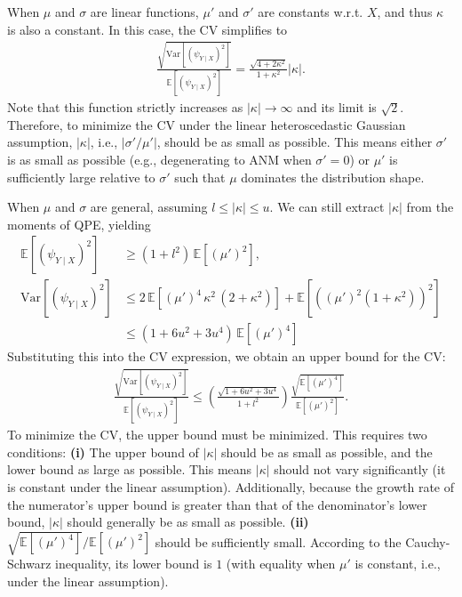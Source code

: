 \documentclass{article}
\theoremstyle{plain}
\theoremstyle{definition}
\theoremstyle{remark}
\begin{document}
When $\mu$ and $\sigma$ are linear functions, $\mu'$ and $\sigma'$ are constants w.r.t. $X$, and thus $\kappa$ is also a constant. In this case, the CV simplifies to 
\begin{align}
\label{eq:heteroscedastic-1}
\frac{\sqrt{\text{Var}\left[(\psi_{Y\mid X})^2\right]}}{\mathbb{E}\left[(\psi_{Y\mid X})^2\right]}=\frac{\sqrt{4+2\kappa^2}}{1+\kappa^2}|\kappa|.    
\end{align}
Note that this function strictly increases as $|\kappa|\to\infty$ and its limit is $\sqrt{2}$. Therefore, to minimize the CV under the linear heteroscedastic Gaussian assumption, $|\kappa|$, i.e., $|\sigma'/\mu'|$, should be as small as possible. This means either $\sigma'$ is as small as possible (e.g., degenerating to ANM when $\sigma'=0$) or $\mu'$ is sufficiently large relative to $\sigma'$ such that $\mu$ dominates the distribution shape.

When $\mu$ and $\sigma$ are general, assuming $l\le|\kappa|\le u$. We can still extract $|\kappa|$ from the moments of QPE, yielding
\[\begin{aligned}\mathbb{E}\left[(\psi_{Y\mid X})^2\right]&\ge(1+l^2)\,\mathbb{E}\left[(\mu')^2\right],\\\text{Var}\left[(\psi_{Y\mid X})^2\right]&\le2\,\mathbb{E}\left[(\mu')^4\,\kappa^2\,(2+\kappa^2)\right]+\mathbb{E}\left[((\mu')^2(1+\kappa^2))^2\right]\\&\le(1+6u^2+3u^4)\,\mathbb{E}\left[(\mu')^4\right]\end{aligned}\]
Substituting this into the CV expression, we obtain an upper bound for the CV:
\begin{align}
\label{eq:heteroscedastic-2}
\frac{\sqrt{\text{Var}\left[(\psi_{Y\mid X})^2\right]}}{\mathbb{E}\left[(\psi_{Y\mid X})^2\right]}\le\left(\frac{\sqrt{1+6u^2+3u^4}}{1+l^2}\right)\frac{\sqrt{\mathbb{E}\left[(\mu')^4\right]}}{\mathbb{E}\left[(\mu')^2\right]}.
\end{align}
To minimize the CV, the upper bound must be minimized. This requires two conditions: \textbf{(i)} The upper bound of $|\kappa|$ should be as small as possible, and the lower bound as large as possible. This means $|\kappa|$ should not vary significantly (it is constant under the linear assumption). Additionally, because the growth rate of the numerator's upper bound is greater than that of the denominator's lower bound, $|\kappa|$ should generally be as small as possible. \textbf{(ii)} $\sqrt{\mathbb{E}\left[(\mu')^4\right]}/\mathbb{E}\left[(\mu')^2\right]$ should be sufficiently small. According to the Cauchy-Schwarz inequality, its lower bound is $1$ (with equality when $\mu'$ is constant, i.e., under the linear assumption).
\end{document}
